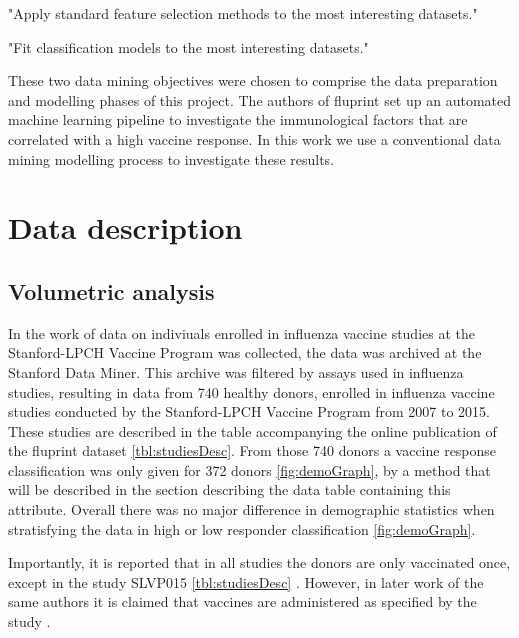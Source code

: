 \begin{displayquote}
"Apply standard feature selection methods to the most interesting datasets."
\end{displayquote}

\begin{displayquote}
"Fit classification models to the most interesting datasets."
\end{displayquote}

These two data mining objectives were chosen to comprise the data preparation
and modelling phases of this project. The authors of fluprint set up an
automated machine learning pipeline to investigate the immunological factors
that are correlated with a high vaccine response. In this work we use a
conventional data mining modelling process to investigate these results.

\section{Data description}

\subsection{Volumetric analysis}

In the work of \cite{tomicFluPRINTDatasetMultidimensional2019} data on
indiviuals enrolled in influenza vaccine studies at the Stanford-LPCH Vaccine
Program was collected, the data was archived at the Stanford Data Miner. This
archive was filtered by assays used in influenza studies, resulting in data
from 740 healthy donors, enrolled in influenza vaccine studies conducted by the
Stanford-LPCH Vaccine Program from 2007 to 2015. These studies are described in
the table accompanying the online publication of the fluprint dataset
\autoref{tbl:studiesDesc}.  From those 740 donors a vaccine response
classification was only given for 372 donors \autoref{fig:demoGraph}, by a
method that will be described in the section describing the data table
containing this attribute. Overall there was no major difference in demographic
statistics when stratisfying the data in high or low responder classification
\autoref{fig:demoGraph}.

Importantly, it is reported that in all studies the donors are only vaccinated
once, except in the study SLVP015 \autoref{tbl:studiesDesc}
\citep{tomicFluPRINTDatasetMultidimensional2019}. However, in later work of the
same authors it is claimed that vaccines are administered as specified by the study
\citep{tomicSIMONAutomatedMachine2019}.

